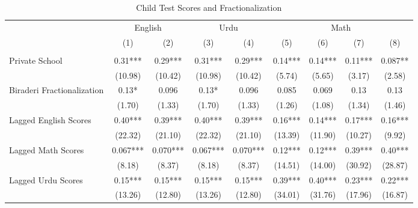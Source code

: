 \begin{sidewaystable}[htbp]\centering
\def\sym#1{\ifmmode^{#1}\else\(^{#1}\)\fi}
\caption{Child Test Scores and Fractionalization \label{kidsnointeract}}
\begin{tabular}{l*{8}{c}}
\toprule
                &\multicolumn{2}{c}{English}&\multicolumn{2}{c}{Urdu} &\multicolumn{4}{c}{Math}                           \\\cmidrule(lr){2-3}\cmidrule(lr){4-5}\cmidrule(lr){6-9}
                &\multicolumn{1}{c}{(1)}&\multicolumn{1}{c}{(2)}&\multicolumn{1}{c}{(3)}&\multicolumn{1}{c}{(4)}&\multicolumn{1}{c}{(5)}&\multicolumn{1}{c}{(6)}&\multicolumn{1}{c}{(7)}&\multicolumn{1}{c}{(8)}\\
                &\multicolumn{1}{c}{}&\multicolumn{1}{c}{}&\multicolumn{1}{c}{}&\multicolumn{1}{c}{}&\multicolumn{1}{c}{}&\multicolumn{1}{c}{}&\multicolumn{1}{c}{}&\multicolumn{1}{c}{}\\
\midrule
Private School  &     0.31***&     0.29***&     0.31***&     0.29***&     0.14***&     0.14***&     0.11***&    0.087** \\
                &  (10.98)   &  (10.42)   &  (10.98)   &  (10.42)   &   (5.74)   &   (5.65)   &   (3.17)   &   (2.58)   \\
Biraderi Fractionalization&     0.13*  &    0.096   &     0.13*  &    0.096   &    0.085   &    0.069   &     0.13   &     0.13   \\
                &   (1.70)   &   (1.33)   &   (1.70)   &   (1.33)   &   (1.26)   &   (1.08)   &   (1.34)   &   (1.46)   \\
Lagged English Scores&     0.40***&     0.39***&     0.40***&     0.39***&     0.16***&     0.14***&     0.17***&     0.16***\\
                &  (22.32)   &  (21.10)   &  (22.32)   &  (21.10)   &  (13.39)   &  (11.90)   &  (10.27)   &   (9.92)   \\
Lagged Math Scores&    0.067***&    0.070***&    0.067***&    0.070***&     0.12***&     0.12***&     0.39***&     0.40***\\
                &   (8.18)   &   (8.37)   &   (8.18)   &   (8.37)   &  (14.51)   &  (14.00)   &  (30.92)   &  (28.87)   \\
Lagged Urdu Scores&     0.15***&     0.15***&     0.15***&     0.15***&     0.39***&     0.40***&     0.23***&     0.22***\\
                &  (13.26)   &  (12.80)   &  (13.26)   &  (12.80)   &  (34.01)   &  (31.76)   &  (17.96)   &  (16.87)   \\

\end{tabular}
\end{sidewaystable}
